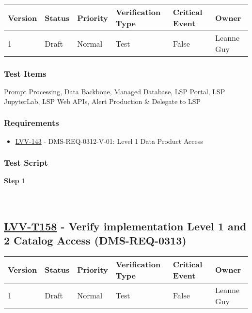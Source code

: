 \begin{longtable}[]{@{}llllll@{}}
\toprule
Version & Status & Priority & Verification Type & Critical Event &
Owner\tabularnewline
\midrule
\endhead
1 & Draft & Normal & Test & False & Leanne Guy\tabularnewline
\bottomrule
\end{longtable}

\hypertarget{test-items-133}{%
\subsubsection{Test Items}\label{test-items-133}}

Prompt Processing, Data Backbone, Managed Database, LSP Portal, LSP
JupyterLab, LSP Web APIs, Alert Production \& Delegate to LSP

\hypertarget{requirements-134}{%
\subsubsection{Requirements}\label{requirements-134}}

\begin{itemize}
\tightlist
\item
  \href{https://jira.lsstcorp.org/browse/LVV-143}{LVV-143} -
  DMS-REQ-0312-V-01: Level 1 Data Product Access
\end{itemize}

\hypertarget{test-script-134}{%
\subsubsection{Test Script}\label{test-script-134}}

\textbf{Step 1}\\
~\\
~\\

\hypertarget{lvv-t158---verify-implementation-level-1-and-2-catalog-access-dms-req-0313}{%
\subsection{\texorpdfstring{\href{https://jira.lsstcorp.org/secure/Tests.jspa\#/testCase/LVV-T158}{LVV-T158}
- Verify implementation Level 1 and 2 Catalog Access
(DMS-REQ-0313)}{LVV-T158 - Verify implementation Level 1 and 2 Catalog Access (DMS-REQ-0313)}}\label{lvv-t158---verify-implementation-level-1-and-2-catalog-access-dms-req-0313}}

\begin{longtable}[]{@{}llllll@{}}
\toprule
Version & Status & Priority & Verification Type & Critical Event &
Owner\tabularnewline
\midrule
\endhead
1 & Draft & Normal & Test & False & Leanne Guy\tabularnewline
\bottomrule
\end{longtable}

